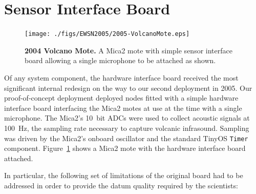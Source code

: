 \section{Sensor Interface Board}
\label{sec-sensorinterfaceboard}
\label{subsec-signalhardware}

\begin{figure}[t] 
\begin{center} 
\texttt{[image: ./figs/EWSN2005/2005-VolcanoMote.eps]}
\end{center} 
\caption{{\bf 2004 Volcano Mote.}
A Mica2 mote with simple sensor interface board allowing a single microphone
to be attached as shown.}
\label{fig-2004volcanomote}
\end{figure}

Of any system component, the hardware interface board received the most
significant internal redesign on the way to our second deployment in 2005.
Our proof-of-concept deployment deployed nodes fitted with a simple hardware
interface board interfacing the Mica2 motes at use at the time with a single
microphone.  The Mica2's 10~bit ADCs were used to collect acoustic signals at
100~Hz, the sampling rate necessary to capture volcanic infrasound.  Sampling
was driven by the Mica2's onboard oscillator and the standard TinyOS
\texttt{Timer} component. Figure~\ref{fig-2004volcanomote} shows a Mica2 mote
with the hardware interface board attached.

In particular, the following set of limitations of the original board had to
be addressed in order to provide the datum quality required by the
scientists:

